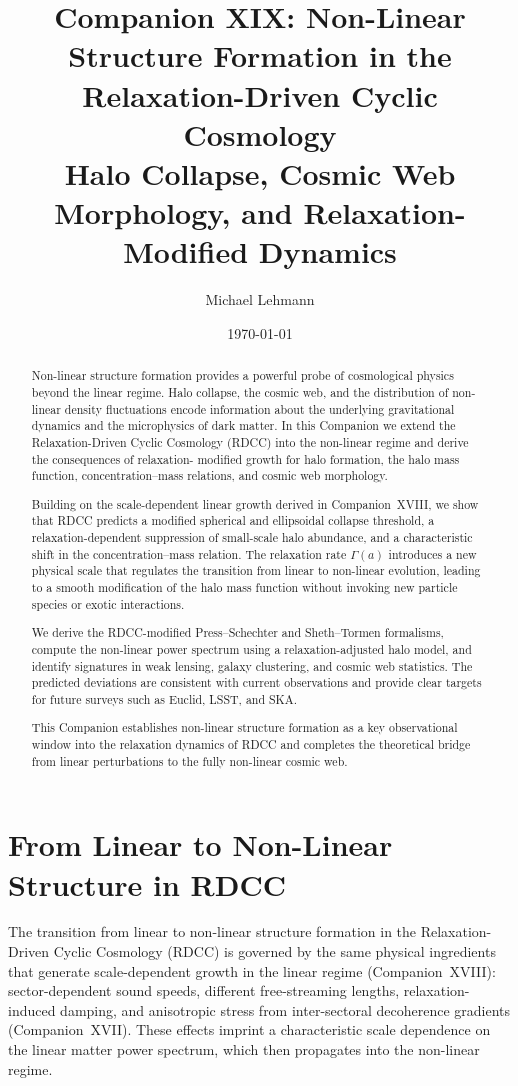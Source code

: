 \documentclass[11pt,a4paper]{article}
\title{\textbf{Companion XIX: Non-Linear Structure Formation in the Relaxation-Driven Cyclic Cosmology}\\
\textbf{Halo Collapse, Cosmic Web Morphology, and Relaxation-Modified Dynamics}}
\author[1]{Michael Lehmann}
\affil[1]{\small Independent Researcher, Relaxation-Driven Cyclic Cosmology (RDCC) Framework\\
\texttt{mi.lehmann@gmx.de}}
\date{\small \today}
\begin{document}
\maketitle

\begin{abstract}
Non-linear structure formation provides a powerful probe of cosmological physics beyond
the linear regime. Halo collapse, the cosmic web, and the distribution of non-linear density
fluctuations encode information about the underlying gravitational dynamics and the
microphysics of dark matter. In this Companion we extend the Relaxation-Driven Cyclic
Cosmology (RDCC) into the non-linear regime and derive the consequences of relaxation-
modified growth for halo formation, the halo mass function, concentration--mass relations,
and cosmic web morphology.

Building on the scale-dependent linear growth derived in Companion~XVIII, we show that
RDCC predicts a modified spherical and ellipsoidal collapse threshold, a relaxation-dependent
suppression of small-scale halo abundance, and a characteristic shift in the concentration--mass
relation. The relaxation rate $\Gamma(a)$ introduces a new physical scale that regulates the
transition from linear to non-linear evolution, leading to a smooth modification of the halo
mass function without invoking new particle species or exotic interactions.

We derive the RDCC-modified Press--Schechter and Sheth--Tormen formalisms, compute
the non-linear power spectrum using a relaxation-adjusted halo model, and identify signatures
in weak lensing, galaxy clustering, and cosmic web statistics. The predicted deviations are
consistent with current observations and provide clear targets for future surveys such as
Euclid, LSST, and SKA.

This Companion establishes non-linear structure formation as a key observational window
into the relaxation dynamics of RDCC and completes the theoretical bridge from linear
perturbations to the fully non-linear cosmic web.
\end{abstract}
\section{From Linear to Non-Linear Structure in RDCC}

The transition from linear to non-linear structure formation in the Relaxation-Driven Cyclic
Cosmology (RDCC) is governed by the same physical ingredients that generate scale-dependent
growth in the linear regime (Companion~XVIII): sector-dependent sound speeds, different
free-streaming lengths, relaxation-induced damping, and anisotropic stress from inter-sectoral
decoherence gradients (Companion~XVII). These effects imprint a characteristic scale
dependence on the linear matter power spectrum, which then propagates into the non-linear
regime.
\end{document}
